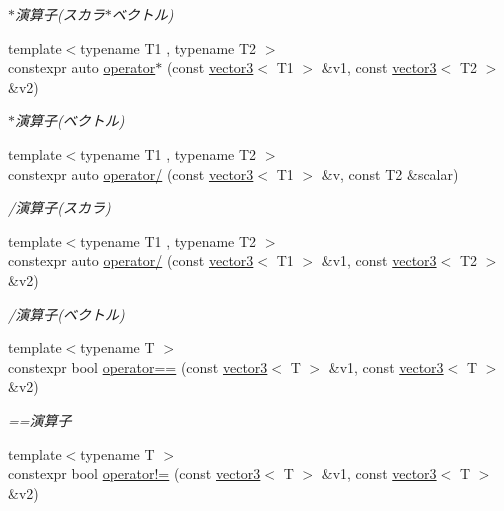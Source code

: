 \begin{DoxyCompactItemize}
\begin{DoxyCompactList}\small\item\em $\ast$演算子(スカラ$\ast$ベクトル) \end{DoxyCompactList}\item 
{\footnotesize template$<$typename T1 , typename T2 $>$ }\\constexpr auto \mbox{\hyperlink{namespacesaki_a59d261ceb3780fa55acc164671b67992}{operator$\ast$}} (const \mbox{\hyperlink{classsaki_1_1vector3}{vector3}}$<$ T1 $>$ \&v1, const \mbox{\hyperlink{classsaki_1_1vector3}{vector3}}$<$ T2 $>$ \&v2)
\begin{DoxyCompactList}\small\item\em $\ast$演算子(ベクトル) \end{DoxyCompactList}\item 
{\footnotesize template$<$typename T1 , typename T2 $>$ }\\constexpr auto \mbox{\hyperlink{namespacesaki_a15270d7bd5638726debe317a16a6b26b}{operator/}} (const \mbox{\hyperlink{classsaki_1_1vector3}{vector3}}$<$ T1 $>$ \&v, const T2 \&scalar)
\begin{DoxyCompactList}\small\item\em /演算子(スカラ) \end{DoxyCompactList}\item 
{\footnotesize template$<$typename T1 , typename T2 $>$ }\\constexpr auto \mbox{\hyperlink{namespacesaki_aee335c88f00f71e52e37fd4bfb77b181}{operator/}} (const \mbox{\hyperlink{classsaki_1_1vector3}{vector3}}$<$ T1 $>$ \&v1, const \mbox{\hyperlink{classsaki_1_1vector3}{vector3}}$<$ T2 $>$ \&v2)
\begin{DoxyCompactList}\small\item\em /演算子(ベクトル) \end{DoxyCompactList}\item 
{\footnotesize template$<$typename T $>$ }\\constexpr bool \mbox{\hyperlink{namespacesaki_a3ce1faca02399d52a09851a1b6e8afe3}{operator==}} (const \mbox{\hyperlink{classsaki_1_1vector3}{vector3}}$<$ T $>$ \&v1, const \mbox{\hyperlink{classsaki_1_1vector3}{vector3}}$<$ T $>$ \&v2)
\begin{DoxyCompactList}\small\item\em ==演算子 \end{DoxyCompactList}\item 
{\footnotesize template$<$typename T $>$ }\\constexpr bool \mbox{\hyperlink{namespacesaki_aa8b0dcab7f268e88f01c92c95cd12135}{operator!=}} (const \mbox{\hyperlink{classsaki_1_1vector3}{vector3}}$<$ T $>$ \&v1, const \mbox{\hyperlink{classsaki_1_1vector3}{vector3}}$<$ T $>$ \&v2)

\end{DoxyCompactItemize}
